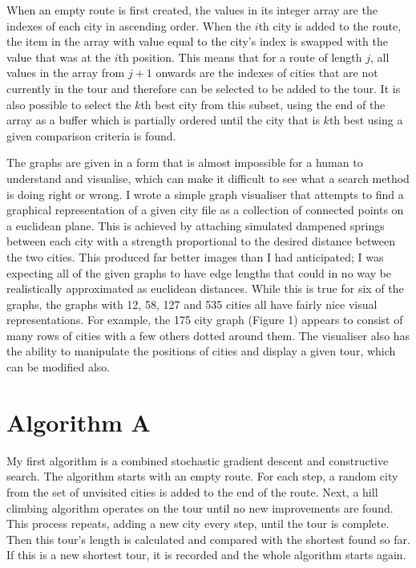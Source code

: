 \documentclass[a4paper,11pt]{article}
\begin{document}
When an empty route is first created, the values in its integer array are the
indexes of each city in ascending order. When the $i$th city is added to the
route, the item in the array with value equal to the city's index is swapped
with the value that was at the $i$th position. This means that for a route of
length $j$, all values in the array from $j+1$ onwards are the indexes of
cities that are not currently in the tour and therefore can be selected to be
added to the tour. It is also possible to select the $k$th best city from this
subset, using the end of the array as a buffer which is partially ordered until
the city that is $k$th best using a given comparison criteria is found.

The graphs are given in a form that is almost impossible for a human to
understand and visualise, which can make it difficult to see what a search
method is doing right or wrong. I wrote a simple graph visualiser that attempts
to find a graphical representation of a given city file as a collection of
connected points on a euclidean plane. This is achieved by attaching simulated
dampened springs between each city with a strength proportional to the desired
distance between the two cities. This produced far better images than I had
anticipated; I was expecting all of the given graphs to have edge lengths that
could in no way be realistically approximated as euclidean distances. While
this is true for six of the graphs, the graphs with 12, 58, 127 and 535 cities
all have fairly nice visual representations. For example, the 175 city graph
(Figure 1) appears to consist of many rows of cities with a few others dotted
around them. The visualiser also has the ability to manipulate the positions of
cities and display a given tour, which can be modified also.

\section{Algorithm A}
My first algorithm is a combined stochastic gradient descent and constructive
search. The algorithm starts with an empty route. For each step, a random city
from the set of unvisited cities is added to the end of the route. Next, a
hill climbing algorithm operates on the tour until no new improvements are
found. This process repeats, adding a new city every step, until the tour is
complete. Then this tour's length is calculated and compared with the shortest
found so far. If this is a new shortest tour, it is recorded and the whole
algorithm starts again.
\end{document}
